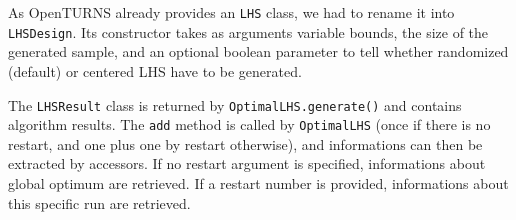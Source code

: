 As OpenTURNS already provides an \texttt{LHS} class, we had to rename it into \texttt{LHSDesign}.
Its constructor takes as arguments variable bounds, the size of the generated sample, and an optional
boolean parameter to tell whether randomized (default) or centered LHS have to be generated.

The \texttt{LHSResult} class is returned by \texttt{OptimalLHS.generate()} and contains algorithm
results.  The \texttt{add} method is called by \texttt{OptimalLHS} (once if there is no restart,
and one plus one by restart otherwise), and informations can then be extracted by accessors.
If no restart argument is specified, informations about global optimum are retrieved.  If a
restart number is provided, informations about this specific run are retrieved.


